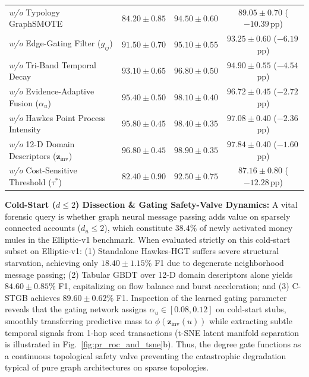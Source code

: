 \begin{table}[t]
{\begin{tabular}{lcccccc}
\textit{w/o} Typology GraphSMOTE & \multicolumn{2}{c}{$84.20 \pm 0.85$} & \multicolumn{2}{c}{$94.50 \pm 0.60$} & \multicolumn{2}{c}{$89.05 \pm 0.70$ ($-10.39$\,pp)} \\
\textit{w/o} Edge-Gating Filter ($g_{ij}$) & \multicolumn{2}{c}{$91.50 \pm 0.70$} & \multicolumn{2}{c}{$95.10 \pm 0.55$} & \multicolumn{2}{c}{$93.25 \pm 0.60$ ($-6.19$\,pp)} \\
\textit{w/o} Tri-Band Temporal Decay & \multicolumn{2}{c}{$93.10 \pm 0.65$} & \multicolumn{2}{c}{$96.80 \pm 0.50$} & \multicolumn{2}{c}{$94.90 \pm 0.55$ ($-4.54$\,pp)} \\
\textit{w/o} Evidence-Adaptive Fusion ($\alpha_u$) & \multicolumn{2}{c}{$95.40 \pm 0.50$} & \multicolumn{2}{c}{$98.10 \pm 0.40$} & \multicolumn{2}{c}{$96.72 \pm 0.45$ ($-2.72$\,pp)} \\
\textit{w/o} Hawkes Point Process Intensity & \multicolumn{2}{c}{$95.80 \pm 0.45$} & \multicolumn{2}{c}{$98.40 \pm 0.35$} & \multicolumn{2}{c}{$97.08 \pm 0.40$ ($-2.36$\,pp)} \\
\textit{w/o} 12-D Domain Descriptors ($\mathbf{z}_{\text{inv}}$) & \multicolumn{2}{c}{$96.80 \pm 0.45$} & \multicolumn{2}{c}{$98.90 \pm 0.35$} & \multicolumn{2}{c}{$97.84 \pm 0.40$ ($-1.60$\,pp)} \\
\textit{w/o} Cost-Sensitive Threshold ($\tau^*$) & \multicolumn{2}{c}{$82.40 \pm 0.90$} & \multicolumn{2}{c}{$92.50 \pm 0.75$} & \multicolumn{2}{c}{$87.16 \pm 0.80$ ($-12.28$\,pp)} \\
\bottomrule
\end{tabular}%
}
\end{table}

\textbf{Cold-Start ($d \le 2$) Dissection \& Gating Safety-Valve Dynamics:} 
A vital forensic query is whether graph neural message passing adds value on sparsely connected accounts ($d_u \le 2$), which constitute $38.4\%$ of newly activated money mules in the Elliptic-v1 benchmark. When evaluated strictly on this cold-start subset on Elliptic-v1:
(1) Standalone Hawkes-HGT suffers severe structural starvation, achieving only $18.40 \pm 1.15\%$ F1 due to degenerate neighborhood message passing;
(2) Tabular GBDT over 12-D domain descriptors alone yields $84.60 \pm 0.85\%$ F1, capitalizing on flow balance and burst acceleration; and
(3) C-STGB achieves $\mathbf{89.60 \pm 0.62\%}$ F1.
Inspection of the learned gating parameter reveals that the gating network assigns $\alpha_u \in [0.08, 0.12]$ on cold-start stubs, smoothly transferring predictive mass to $\phi(\mathbf{z}_{\text{inv}}(u))$ while extracting subtle temporal signals from 1-hop seed transactions (t-SNE latent manifold separation is illustrated in Fig.~\ref{fig:pr_roc_and_tsne}b). Thus, the degree gate functions as a continuous topological safety valve preventing the catastrophic degradation typical of pure graph architectures on sparse topologies.

